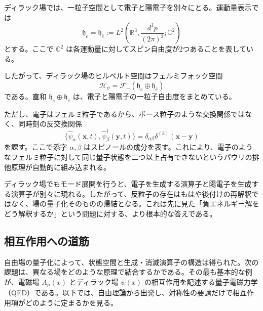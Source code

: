 ディラック場では、一粒子空間として電子と陽電子を別々にとる。運動量表示では
\[
\mathfrak{h}_e
=
\mathfrak{h}_{\bar e}
:=
L^2\!\left(\mathbb{R}^3,\frac{d^3p}{(2\pi)^3};\mathbb{C}^2\right)
\]
とする。ここで $\mathbb{C}^2$ は各運動量に対してスピン自由度が2つあることを表している。

したがって、ディラック場のヒルベルト空間はフェルミフォック空間
\[
\mathcal{H}_{\psi}
=
\mathcal{F}_-(\mathfrak{h}_e\oplus \mathfrak{h}_{\bar e})
\]
である。直和 $\mathfrak{h}_e\oplus \mathfrak{h}_{\bar e}$ は、電子と陽電子の一粒子自由度をまとめている。

ただし、電子はフェルミ粒子であるから、ボース粒子のような交換関係ではなく、同時刻の反交換関係
\[
\{\hat{\psi}_\alpha(\mathbf{x},t), \hat{\psi}_\beta^\dagger(\mathbf{y},t)\}
= \delta_{\alpha\beta}\delta^{(3)}(\mathbf{x}-\mathbf{y})
\]
を課す。ここで添字 $\alpha,\beta$ はスピノールの成分を表す。これにより、電子のようなフェルミ粒子に対して同じ量子状態を二つ以上占有できないというパウリの排他原理が自動的に組み込まれる。

ディラック場でもモード展開を行うと、電子を生成する演算子と陽電子を生成する演算子が別々に現れる。したがって、反粒子の存在はもはや後付けの再解釈ではなく、場の量子化そのものの帰結となる。これは先に見た「負エネルギー解をどう解釈するか」という問題に対する、より根本的な答えである。

\subsection{相互作用への道筋}
自由場の量子化によって、状態空間と生成・消滅演算子の構造は得られた。次の課題は、異なる場をどのような原理で結合するかである。その最も基本的な例が、電磁場 $A_\mu(x)$ とディラック場 $\psi(x)$ の相互作用を記述する量子電磁力学（QED）である。以下では、自由理論から出発し、対称性の要請だけで相互作用項がどのように定まるかを見る。
